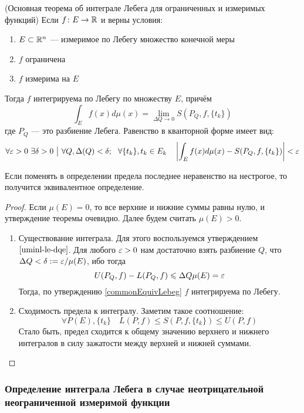 \begin{theorem} (Основная теорема об интеграле Лебега для ограниченных и измеримых функций)
	Если $f \colon E \to \mathbb{R}$ и верны условия:
	\begin{enumerate}
		\item $E \subset \mathbb{R}^n$ --- измеримое по Лебегу множество конечной меры
		
		\item $f$ ограничена
		
		\item $f$ измерима на $E$
	\end{enumerate}
	Тогда $f$ интегрируема по Лебегу по множеству $E$, причём
	\[
		\int_E f(x)d\mu(x) = \lim_{\Delta Q \to 0} S(P_Q, f, \{t_k\})
	\]
	где $P_Q$ --- это разбиение Лебега. Равенство в кванторной форме имеет вид:
	\[
		\forall \varepsilon > 0\ \exists \delta > 0 \ \big|\  \forall Q, \Delta(Q) < \delta;\ \ \forall \{t_k\}, t_k \in E_k \quad \left|\int_E f(x)d\mu(x) - S(P_Q, f, \{t_k\})\right| < \varepsilon
	\]
\end{theorem}

\begin{reminder}
	Если поменять в определении предела последнее неравенство на нестрогое, то получится эквивалентное определение.
\end{reminder}

\begin{proof}
	Если $\mu(E) = 0$, то все верхние и нижние суммы равны нулю, и утверждение теоремы очевидно. Далее будем считать $\mu(E) > 0$.
	\begin{enumerate}
		\item Существование интеграла. Для этого воспользуемся утверждением $\ref{uminl-le-dqe}$. Для любого $\varepsilon > 0$ нам достаточно взять разбиение $Q$, что $\Delta Q < \delta := \varepsilon / \mu(E)$, ибо тогда
		\[
			U(P_Q, f) - L(P_Q, f) \leqslant \Delta Q \mu(E) = \varepsilon
		\]
		Тогда, по утверждению \ref{commonEquivLebeg} $f$ интегрируема по Лебегу.
		
		\item Сходимость предела к интегралу. Заметим такое соотношение:
		\[
			\forall P(E), \{t_k\} \quad L(P, f) \le S(P, f, \{t_k\}) \le U(P, f)
		\]
		Стало быть, предел сходится к общему значению верхнего и нижнего интегралов в силу зажатости между верхней и нижней суммами.
	\end{enumerate}
\end{proof}

\subsubsection*{Определение интеграла Лебега в случае неотрицательной неограниченной измеримой функции}

